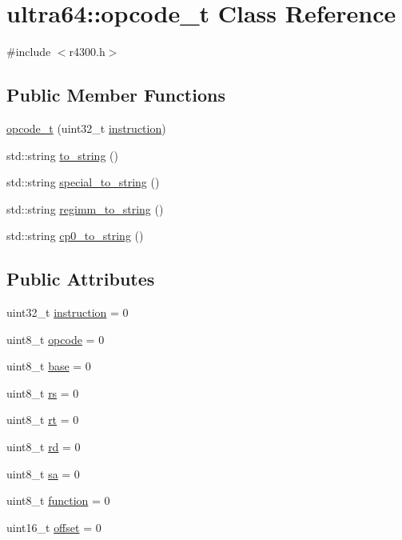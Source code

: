 \hypertarget{classultra64_1_1opcode__t}{}\section{ultra64\+:\+:opcode\+\_\+t Class Reference}
\label{classultra64_1_1opcode__t}


{\ttfamily \#include $<$r4300.\+h$>$}

\subsection*{Public Member Functions}
\begin{DoxyCompactItemize}
\item 
\hyperlink{classultra64_1_1opcode__t_a3869610ce2c9c9c22f2ed0731c9992bc}{opcode\+\_\+t} (uint32\+\_\+t \hyperlink{classultra64_1_1opcode__t_a9e4c7797d3cfa13985336313426ccd47}{instruction})
\item 
std\+::string \hyperlink{classultra64_1_1opcode__t_a1d1f6ce464c46b26af898e41a19c48a8}{to\+\_\+string} ()
\item 
std\+::string \hyperlink{classultra64_1_1opcode__t_a8bc3a5c348263db28d26e090356ece62}{special\+\_\+to\+\_\+string} ()
\item 
std\+::string \hyperlink{classultra64_1_1opcode__t_acff6bf9cffc15368617bafd9ace8a5fc}{regimm\+\_\+to\+\_\+string} ()
\item 
std\+::string \hyperlink{classultra64_1_1opcode__t_a4d00c4cdb1b33b3a4afbc0d4eaeedcaf}{cp0\+\_\+to\+\_\+string} ()
\end{DoxyCompactItemize}
\subsection*{Public Attributes}
\begin{DoxyCompactItemize}
\item 
uint32\+\_\+t \hyperlink{classultra64_1_1opcode__t_a9e4c7797d3cfa13985336313426ccd47}{instruction} = 0
\item 
uint8\+\_\+t \hyperlink{classultra64_1_1opcode__t_a3b0bd99486202048eba68fa5ef9fd55c}{opcode} = 0
\item 
uint8\+\_\+t \hyperlink{classultra64_1_1opcode__t_a79e92ff0e2851184338e1c8522532bbc}{base} = 0
\item 
uint8\+\_\+t \hyperlink{classultra64_1_1opcode__t_af6b3b1915363f5fdfa0bc4d57bb287ef}{rs} = 0
\item 
uint8\+\_\+t \hyperlink{classultra64_1_1opcode__t_a5e472884ffb0c969514280934cb3a17d}{rt} = 0
\item 
uint8\+\_\+t \hyperlink{classultra64_1_1opcode__t_a26cc85c3a18f08e7e78cf9b2d006472e}{rd} = 0
\item 
uint8\+\_\+t \hyperlink{classultra64_1_1opcode__t_a19605b9e9c4cd00b783db1411556cab4}{sa} = 0
\item 
uint8\+\_\+t \hyperlink{classultra64_1_1opcode__t_ac0756f3e02d8d72cb29b92d98d7aa9cd}{function} = 0
\item 
uint16\+\_\+t \hyperlink{classultra64_1_1opcode__t_a07c203f0b2c5677b8854f8e15c6a63bd}{offset} = 0
\end{DoxyCompactItemize}
